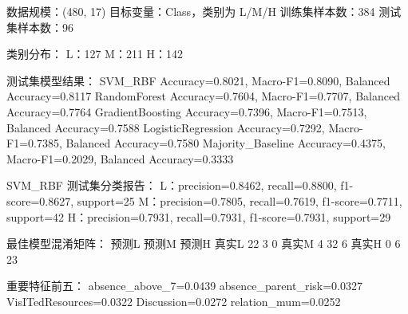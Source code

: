 \documentclass[UTF8,a4paper,12pt]{ctexart}
\begin{document}
\begin{CodeBlock}
数据规模：(480, 17)
目标变量：Class，类别为 L/M/H
训练集样本数：384
测试集样本数：96

类别分布：
L：127
M：211
H：142

测试集模型结果：
SVM_RBF              Accuracy=0.8021, Macro-F1=0.8090, Balanced Accuracy=0.8117
RandomForest         Accuracy=0.7604, Macro-F1=0.7707, Balanced Accuracy=0.7764
GradientBoosting     Accuracy=0.7396, Macro-F1=0.7513, Balanced Accuracy=0.7588
LogisticRegression   Accuracy=0.7292, Macro-F1=0.7385, Balanced Accuracy=0.7580
Majority_Baseline    Accuracy=0.4375, Macro-F1=0.2029, Balanced Accuracy=0.3333

SVM_RBF 测试集分类报告：
L：precision=0.8462, recall=0.8800, f1-score=0.8627, support=25
M：precision=0.7805, recall=0.7619, f1-score=0.7711, support=42
H：precision=0.7931, recall=0.7931, f1-score=0.7931, support=29

最佳模型混淆矩阵：
       预测L  预测M  预测H
真实L    22     3     0
真实M     4    32     6
真实H     0     6    23

重要特征前五：
absence_above_7=0.0439
absence_parent_risk=0.0327
VisITedResources=0.0322
Discussion=0.0272
relation_mum=0.0252
\end{CodeBlock}
\end{document}
